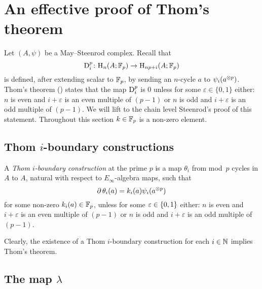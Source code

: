 
\appendix
\section{An effective proof of Thom's theorem}\label{s:thom}


Let $(A,\psi)$ be a May--Steenrod complex.
Recall that
\[
\mathrm{D}_i^p \colon \mathrm{H}_n(A; {\mathbb{F}_p}) \to \mathrm{H}_{np+i}(A; {\mathbb{F}_p})
\]
is defined, after extending scalar to ${\mathbb{F}_p}$, by sending an $n$-cycle $a$ to $\psi_i(a^{\otimes p})$.
Thom's theorem (\cite[218]{steenrod1953cyclic}) states that the map $\mathrm{D}_i^p$ is $0$ unless for some $\varepsilon \in \{0,1\}$ either: $n$ is even and $i+\varepsilon$ is an even multiple of $(p-1)$ or $n$ is odd and $i+\varepsilon$ is an odd multiple of $(p-1)$.
We will lift to the chain level Steenrod's proof of this statement.
Throughout this section $k \in {\mathbb{F}_p}$ is a non-zero element.

\subsection{Thom $i$-boundary constructions}

A \textit{Thom $i$-boundary construction} at the prime $p$ is a map $\theta_i$ from mod~$p$ cycles in $A$ to $A$, natural with respect to $E_\infty$-algebra maps, such that
\[
\operatorname{\partial} \theta_i(a) = k_i(a) \psi_i(a^{\otimes p})
\]
for some non-zero $k_i(a) \in {\mathbb{F}_p}$, unless for some $\varepsilon \in \{0,1\}$ either: $n$ is even and $i+\varepsilon$ is an even multiple of $(p-1)$ or $n$ is odd and $i+\varepsilon$ is an odd multiple of $(p-1)$.

Clearly, the existence of a Thom $i$-boundary construction for each $i \in \mathbb{N}$ implies Thom's theorem.

\subsection{The map $\lambda$}

